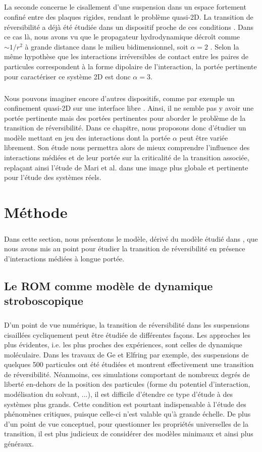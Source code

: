 \subparagraph{}La seconde concerne le cisallement d'une suspension dans un espace fortement confiné entre des plaques rigides, rendant le problème quasi-2D. La transition de réversibilité a déjà été étudiée dans un dispositif proche de ces conditions \cite{guasto_hydrodynamic_2010}. Dans ce cas là, nous avons vu que le propagateur hydrodynamique décroît comme $\sim 1/r^2$ à grande distance dans le milieu bidimensionnel, soit $\alpha = 2$ \cite{diamant_hydrodynamic_2009}. Selon la même hypothèse que les interactions irréversibles de contact entre les paires de particules correspondent à la forme dipolaire de l'interaction, la portée pertinente pour caractériser ce système 2D est donc $\alpha = 3$.

\subparagraph{}Nous pouvons imaginer encore d'autres dispositifs, comme par exemple un confinement quasi-2D sur une interface libre \cite{farhadi_shear_induced_2017}. Ainsi, il ne semble pas y avoir une portée pertinente mais des portées pertinentes pour aborder le problème de la transition de réversibilité. Dans ce chapitre, nous proposons donc d'étudier un modèle mettant en jeu des interactions dont la portée $\alpha$ peut être variée librement. Son étude nous permettra alors de mieux comprendre l'influence des interactions médiées et de leur portée sur la criticalité de la transition associée, replaçant ainsi l'étude de Mari et al. \cite{mari_absorbing_2022} dans une image plus globale et pertinente pour l'étude des systèmes réels.

\section{Méthode}

\subparagraph{}Dans cette section, nous présentons le modèle, dérivé du modèle étudié dans \cite{mari_absorbing_2022}, que nous avons mis au point pour étudier la transition de réversibilité en présence d'interactions médiées à longue portée.

\subsection{Le ROM comme modèle de dynamique stroboscopique}

\subparagraph{}D'un point de vue numérique, la transition de réversibilité dans les suspensions cisaillées cycliquement peut être étudiée de différentes façons. Les approches les plus évidentes, i.e. les plus proches des expériences, sont celles de dynamique moléculaire. Dans les travaux de Ge et Elfring \cite{ge_rheology_2022} par exemple, des suspensions de quelques 500 particules ont été étudiées et montrent effectivement une transition de réversibilité. Néanmoins, ces simulations comportant de nombreux degrés de liberté en-dehors de la position des particules (forme du potentiel d'interaction, modélisation du solvant, ...), il est difficile d'étendre ce type d'étude à des systèmes plus grands. Cette condition est pourtant indispensable à l'étude des phénomènes critiques, puisque celle-ci n'est valable qu'à grande échelle. De plus d'un point de vue conceptuel, pour questionner les propriétés universelles de la transition, il est plus judicieux de considérer des modèles minimaux et ainsi plus généraux.

